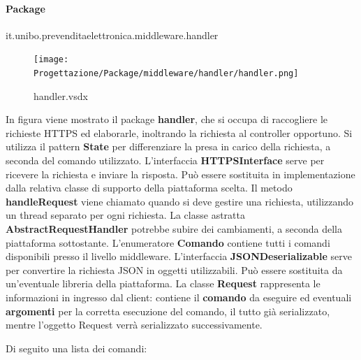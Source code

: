 \documentclass[a4paper]{article}
\begin{document}
\newpage

\paragraph{Package} it.unibo.prevenditaelettronica.middleware.handler


\begin{figure}[H]
    \texttt{[image: Progettazione/Package/middleware/handler/handler.png]}
    \centering
    \caption{handler.vsdx}
\end{figure}

In figura viene mostrato il package \textbf{handler}, che si occupa di raccogliere le richieste HTTPS ed elaborarle, inoltrando la richiesta al controller opportuno. Si utilizza il pattern \textbf{State} per differenziare la presa in carico della richiesta, a seconda del comando utilizzato. L'interfaccia \textbf{HTTPSInterface} serve per ricevere la richiesta e inviare la risposta. Può essere sostituita in implementazione dalla relativa classe di supporto della piattaforma scelta. Il metodo \textbf{handleRequest} viene chiamato quando si deve gestire una richiesta, utilizzando un thread separato per ogni richiesta. La classe astratta \textbf{AbstractRequestHandler} potrebbe subire dei cambiamenti, a seconda della piattaforma sottostante. L'enumeratore \textbf{Comando} contiene tutti i comandi disponibili presso il livello middleware. L'interfaccia \textbf{JSONDeserializable} serve per convertire la richiesta JSON in oggetti utilizzabili. Può essere sostituita da un'eventuale libreria della piattaforma. La classe \textbf{Request} rappresenta le informazioni in ingresso dal client: contiene il \textbf{comando} da eseguire ed eventuali \textbf{argomenti} per la corretta esecuzione del comando, il tutto già serializzato, mentre l'oggetto Request verrà serializzato successivamente.

\newpage

Di seguito una lista dei comandi:
\end{document}
